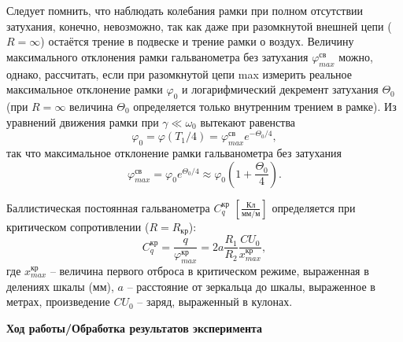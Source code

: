 \documentclass[a4paper, 12pt]{article}
\begin{document}
    Следует помнить, что наблюдать колебания рамки при полном отсутствии затухания, конечно, невозможно, так как даже при разомкнутой внешней цепи ($R = \infty$) остаётся трение в подвеске и трение рамки о воздух. Величину максимального отклонения рамки гальванометра без затухания $\varphi^{св}_{max}$ можно, однако, рассчитать, если при разомкнутой цепи max измерить реальное максимальное отклонение рамки $\varphi_0$ и логарифмический декремент затухания $\Theta_0$ (при $R = \infty$ величина $\Theta_0$ определяется только внутренним трением в рамке). Из уравнений движения рамки при $\gamma \ll \omega_0$ вытекают равенства
    \begin{equation}
        \varphi_0 = \varphi(T_1/4) = \varphi^{св}_{max} e^{-\Theta_0/4},
    \end{equation}
    так что максимальное отклонение рамки гальванометра без затухания
    \begin{equation}
        \varphi^{св}_{max} = \varphi_0 e^{\Theta_0/4} \approx \varphi_0 \left( 1 + \frac{\Theta_0}{4} \right).
        \label{eq6}
    \end{equation}
    
    Баллистическая постоянная гальванометра $C^{кр}_q$ $\left[ \frac{\text{Кл}}{\text{мм}/\text{м}} \right]$ определяется при критическом сопротивлении ($R = R_{кр}$):
    \begin{equation}
        C^{кр}_q = \frac{q}{\varphi^{кр}_{max}} = 2a \frac{R_1}{R_2} \frac{CU_0}{x^{кр}_{max}},
        \label{eq7}
    \end{equation}
    где $x^{кр}_{max}$ – величина первого отброса в критическом режиме, выраженная в делениях шкалы (мм), $a$ – расстояние от зеркальца до шкалы, выраженное в метрах, произведение $CU_0$ – заряд, выраженный в кулонах.
    
    \newpage
    
    \begin{flushleft}
        {\Large {\bf Ход работы/Обработка результатов эксперимента}}
    \end{flushleft}
    
\end{document}
